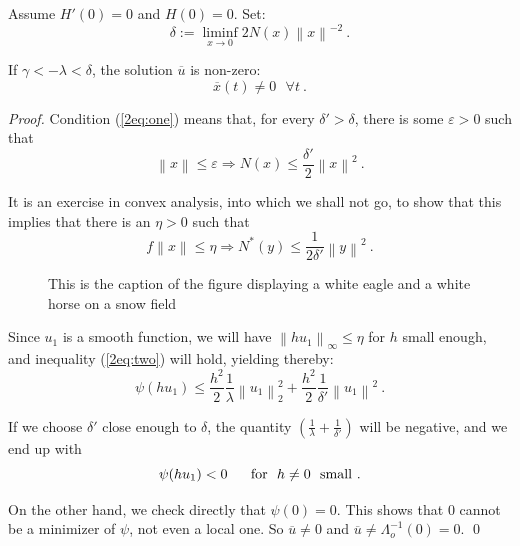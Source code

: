 \documentclass{llncs}
\begin{document}
%
\begin{proposition}
Assume $H'(0)=0$ and $ H(0)=0$. Set:
\begin{equation}
  \delta := \liminf_{x\to 0} 2 N (x) \left\|x\right\|^{-2}\ .
  \label{2eq:one}
\end{equation}

If $\gamma < - \lambda < \delta$,
the solution $\overline{u}$ is non-zero:
\begin{equation}
  \overline{x} (t) \ne 0\ \ \ \forall t\ .
\end{equation}
\end{proposition}
%
\begin{proof}
Condition (\ref{2eq:one}) means that, for every
$\delta ' > \delta$, there is some $\varepsilon > 0$ such that
\begin{equation}
  \left\|x\right\| \le \varepsilon \Rightarrow N (x) \le
  \frac{\delta '}{2} \left\|x\right\|^{2}\ .
\end{equation}

It is an exercise in convex analysis, into which we shall not go, to
show that this implies that there is an $\eta > 0$ such that
\begin{equation}
  f\left\|x\right\| \le \eta
  \Rightarrow N^{\ast} (y) \le \frac{1}{2\delta '}
  \left\|y\right\|^{2}\ .
  \label{2eq:two}
\end{equation}

\begin{figure}
\vspace{2.5cm}
\caption{This is the caption of the figure displaying a white eagle and
a white horse on a snow field}
\end{figure}

Since $u_{1}$ is a smooth function, we will have
$\left\|hu_{1}\right\|_\infty \le \eta$
for $h$ small enough, and inequality (\ref{2eq:two}) will hold,
yielding thereby:
\begin{equation}
  \psi (hu_{1}) \le \frac{h^{2}}{2}
  \frac{1}{\lambda} \left\|u_{1} \right\|_{2}^{2} + \frac{h^{2}}{2}
  \frac{1}{\delta '} \left\|u_{1}\right\|^{2}\ .
\end{equation}

If we choose $\delta '$ close enough to $\delta$, the quantity
$\left(\frac{1}{\lambda} + \frac{1}{\delta '}\right)$
will be negative, and we end up with
\begin{equation}
  \psi (hu_{1}) < 0\ \ \ \ \ {\rm for}\ \ h\ne 0\ \ {\rm small}\ .
\end{equation}

On the other hand, we check directly that $\psi (0) = 0$. This shows
that 0 cannot be a minimizer of $\psi$, not even a local one.
So $\overline{u} \ne 0$ and
$\overline{u} \ne \Lambda_{o}^{-1} (0) = 0$. \qed
\end{proof}
\end{document}

